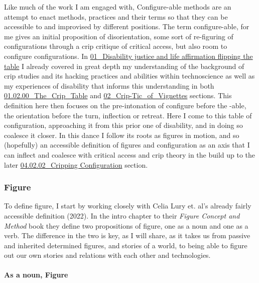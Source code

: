Like much of the work I am engaged with, Configure-able methods are an
attempt to enact methods, practices and their terms so that they can be
accessible to and improvised by different positions. The term
configure-able, for me gives an initial proposition of disorientation,
some sort of re-figuring of configurations through a crip critique of
critical access, but also room to configure configurations. In
\href{../../01_Disability_justice_and_life_affirmation_flipping_the_table/01_Disability\%20justice\%20and\%20life\%20affirmation\%20flipping\%20the\%20table.md}{01\_Disability
justice and life affirmation flipping the table} I already covered in
great depth my understanding of the background of crip studies and its
hacking practices and abilities within technoscience as well as my
experiences of disability that informs this understanding in both
\href{../../01_Disability_justice_and_life_affirmation_flipping_the_table/sections/01.02.00_The_Crip_Table.md}{01.02.00\_The\_Crip\_Table}
and
\href{../../02_Crip-Tic_of_Vignettes/02_Crip-Tic_of_Vignettes.md}{02\_Crip-Tic\_of\_Vignettes}
sections. This definition here then focuses on the pre-intonation of
configure before the -able, the orientation before the turn, inflection
or retreat. Here I come to this table of configuration, approaching it
from this prior one of disability, and in doing so coalesce it closer.
In this dance I follow its roots as figures in motion, and so
(hopefully) an accessible definition of figures and configuration as an
axis that I can inflect and coalesce with critical access and crip
theory in the build up to the later
\href{04.02.02_Cripping\%20Configuration.md}{04.02.02\_Cripping
Configuration} section.

\hypertarget{figure}{%
\subsubsection{Figure}\label{figure}}

To define figure, I start by working closely with Celia Lury et. al's
already fairly accessible definition (2022). In the intro chapter to
their \emph{Figure Concept and Method} book they define two propositions
of figure, one as a noun and one as a verb. The difference in the two is
key, as I will share, as it takes us from passive and inherited
determined figures, and stories of a world, to being able to figure out
our own stories and relations with each other and technologies.

\hypertarget{as-a-noun-figure}{%
\paragraph{As a noun, Figure}\label{as-a-noun-figure}}

